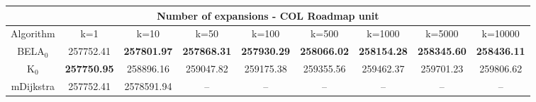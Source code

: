 \begin{tabular}{c|cccccccc}\toprule
\multicolumn{9}{c}{Number of expansions - COL Roadmap unit}\\ \midrule
Algorithm & k=1 & k=10 & k=50 & k=100 & k=500 & k=1000 & k=5000 & k=10000 \\ \midrule
BELA$_0$ & 257752.41 & \textbf{257801.97} & \textbf{257868.31} & \textbf{257930.29} & \textbf{258066.02} & \textbf{258154.28} & \textbf{258345.60} & \textbf{258436.11} \\
K$_0$ & \textbf{257750.95} & 258896.16 & 259047.82 & 259175.38 & 259355.56 & 259462.37 & 259701.23 & 259806.62 \\
mDijkstra & 257752.41 & 2578591.94 & -- & -- & -- & -- & -- & -- \\ \bottomrule 
\end{tabular}
